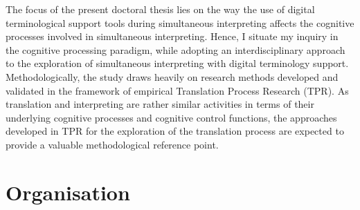 The focus of the present doctoral thesis lies on the way the use of digital terminological support tools during simultaneous interpreting affects the cognitive processes involved in simultaneous interpreting. Hence, I situate my inquiry in the cognitive processing paradigm, while adopting an interdisciplinary approach to the exploration of simultaneous interpreting with digital terminology support. Methodologically, the study draws heavily on research methods developed and validated in the framework of empirical Translation Process Research (TPR). As translation and interpreting are rather similar activities in terms of their underlying cognitive processes and cognitive control functions, the approaches developed in TPR for the exploration of the translation process are expected to provide a valuable methodological reference point.\label{paradigmEnd}


\section*{Organisation}

